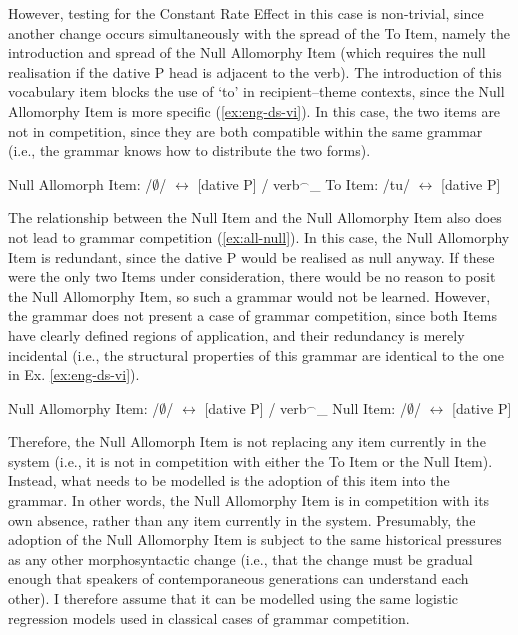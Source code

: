 	However, testing for the Constant Rate Effect in this case is non-trivial, since another change occurs simultaneously with the spread of the To Item, namely the introduction and spread of the Null Allomorphy Item (which requires the null realisation if the dative P head is adjacent to the verb). The introduction of this vocabulary item blocks the use of `to' in recipient--theme contexts, since the Null Allomorphy Item is more specific (\ref{ex:eng-ds-vi}). In this case, the two items are not in competition, since they are both compatible within the same grammar (i.e., the grammar knows how to distribute the two forms).

	\begin{exe}
		\begin{xlist}
			\ex Null Allomorph Item: /$\emptyset$/ $\leftrightarrow$ [dative P] / verb$^{\smallfrown}$\_
			\ex To Item: /tu/ $\leftrightarrow$ [dative P]
		\end{xlist}
	\end{exe}

	The relationship between the Null Item and the Null Allomorphy Item also does not lead to grammar competition (\ref{ex:all-null}). In this case, the Null Allomorphy Item is redundant, since the dative P would be realised as null anyway. If these were the only two Items under consideration, there would be no reason to posit the Null Allomorphy Item, so such a grammar would not be learned. However, the grammar does not present a case of grammar competition, since both Items have clearly defined regions of application, and their redundancy is merely incidental (i.e., the structural properties of this grammar are identical to the one in Ex. \ref{ex:eng-ds-vi}).

	\begin{exe}
		\ex \label{ex:all-null} 
			\begin{xlist}
				\ex Null Allomorphy Item: /$\emptyset$/ $\leftrightarrow$ [dative P] / verb$^{\smallfrown}$\_
				\ex Null Item:  /$\emptyset$/ $\leftrightarrow$ [dative P]
			\end{xlist}
	\end{exe}

	Therefore, the Null Allomorph Item is not replacing any item currently in the system (i.e., it is not in competition with either the To Item or the Null Item). Instead, what needs to be modelled is the adoption of this item into the grammar. In other words, the Null Allomorphy Item is in competition with its own absence, rather than any item currently in the system. Presumably, the adoption of the Null Allomorphy Item is subject to the same historical pressures as any other morphosyntactic change (i.e., that the change must be gradual enough that speakers of contemporaneous generations can understand each other). I therefore assume that it can be modelled using the same logistic regression models used in classical cases of grammar competition.

